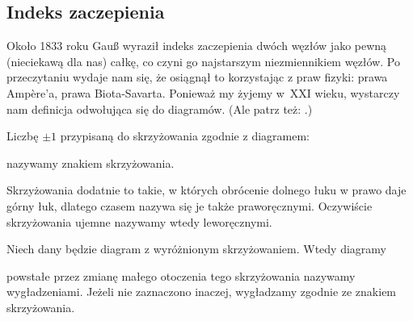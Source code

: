 
\subsection{Indeks zaczepienia}
%
Około 1833 roku Gauß wyraził indeks zaczepienia dwóch węzłów jako pewną (nieciekawą dla nas) całkę, co czyni go najstarszym niezmiennikiem węzłów.
%
Po przeczytaniu \cite{colberg13} wydaje nam się, że osiągnął to korzystając z praw fizyki: prawa Ampère'a, prawa Biota-Savarta.
Ponieważ my żyjemy w~XXI wieku, wystarczy nam definicja odwołująca się do diagramów.
(Ale patrz też: \cite[s. 11]{kawauchi96}.)

\begin{definition}[znak]
%
    Liczbę $\pm 1$ przypisaną do skrzyżowania zgodnie z diagramem:
\begin{comment}
    \[
        \sign \left( \MediumPlusCrossingArrows \right) = +1 \quad
        \sign \left( \MediumMinusCrossingArrows \right) = -1
    \]
\end{comment}
    nazywamy znakiem skrzyżowania.
\end{definition}

Skrzyżowania dodatnie to takie, w których obrócenie dolnego łuku w prawo daje górny łuk, dlatego czasem nazywa się je także praworęcznymi.
Oczywiście skrzyżowania ujemne nazywamy wtedy leworęcznymi.
%
%

\begin{definition}[wygładzenie]
%
    Niech dany będzie diagram z wyróżnionym skrzyżowaniem.
    Wtedy diagramy
\begin{comment}
    \begin{figure}[H]
        \begin{minipage}[b]{.48\linewidth}
            \[
                \LargeAlphaSmoothing
            \]
            \subcaption{wygładzenie dodatnie}
        \end{minipage}
        \begin{minipage}[b]{.48\linewidth}
            \[
                \LargeBetaSmoothing
            \]
            \subcaption{wygładzenie ujemne}
        \end{minipage}
    \end{figure}
\end{comment}
    powstałe przez zmianę małego otoczenia tego skrzyżowania nazywamy wygładzeniami.
    Jeżeli nie zaznaczono inaczej, wygładzamy zgodnie ze znakiem skrzyżowania.
\end{definition}

